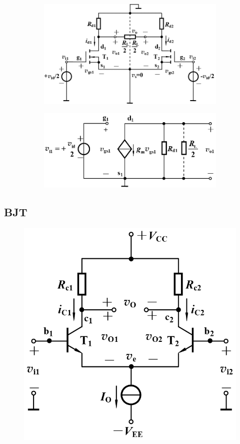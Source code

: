 \begin{figure}[H]
  \centering
  \begin{subfigure}{.5\textwidth}
    \centering
    \includegraphics[width=\linewidth]{figures/Differential-Amplifier-MOS-1}
    \label{fig:}
  \end{subfigure}%
  \begin{subfigure}{.5\textwidth}
    \centering
    \includegraphics[width=\linewidth]{figures/Differential-Amplifier-MOS-2}
    \label{fig:}
  \end{subfigure}
  \label{fig:}
\end{figure}

\subsection{BJT}

\begin{figure}[H]
  \centering
  \includegraphics[width=0.5\linewidth]{figures/Differential-Amplifier-BJT-1}
  \label{fig:}
\end{figure}



